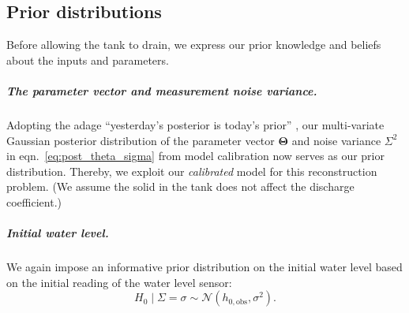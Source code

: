 \documentclass[openacc]{rsproca_new}%
\begin{document}
\subsection{Prior distributions}
Before allowing the tank to drain, we express our prior knowledge and beliefs about the inputs and parameters. 

\subparagraph{The parameter vector and measurement noise variance.}
Adopting the adage ``yesterday's posterior is today's prior'' \cite{calvetti2010subjective}, 
our multi-variate Gaussian posterior distribution of the parameter vector $\boldsymbol \Theta$ and noise variance $\Sigma^2$ in eqn.~\ref{eq:post_theta_sigma} from model calibration now serves as our prior distribution.
Thereby, we exploit our \emph{calibrated} model for this reconstruction problem.
(We assume the solid in the tank does not affect the discharge coefficient.)

\vspace{-\baselineskip}
\subparagraph{Initial water level.} We again impose an informative prior distribution on the initial water level based on the initial reading of the water level sensor:
\begin{equation}
	H_0 \mid \Sigma = \sigma \sim \mathcal{N}(h_{0, \text{obs}}, \sigma^2).
\end{equation}
\end{document}
